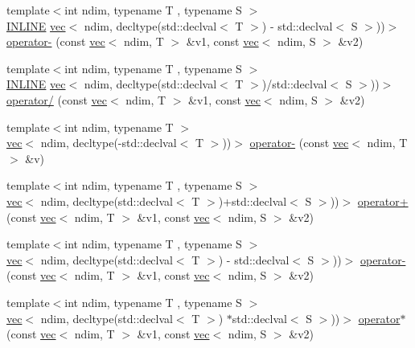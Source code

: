\begin{DoxyCompactItemize}
\item 
{\footnotesize template$<$int ndim, typename T , typename S $>$ }\\\hyperlink{common_8hpp_a2eb6f9e0395b47b8d5e3eeae4fe0c116}{I\+N\+L\+I\+NE} \hyperlink{structshark_1_1ndim_1_1vec}{vec}$<$ ndim, decltype(std\+::declval$<$ T $>$) -\/ std\+::declval$<$ S $>$))$>$ \hyperlink{namespaceshark_1_1ndim_a562ed7a1dc9951ae1674a1988710171c}{operator-\/} (const \hyperlink{structshark_1_1ndim_1_1vec}{vec}$<$ ndim, T $>$ \&v1, const \hyperlink{structshark_1_1ndim_1_1vec}{vec}$<$ ndim, S $>$ \&v2)
\item 
{\footnotesize template$<$int ndim, typename T , typename S $>$ }\\\hyperlink{common_8hpp_a2eb6f9e0395b47b8d5e3eeae4fe0c116}{I\+N\+L\+I\+NE} \hyperlink{structshark_1_1ndim_1_1vec}{vec}$<$ ndim, decltype(std\+::declval$<$ T $>$)/std\+::declval$<$ S $>$))$>$ \hyperlink{namespaceshark_1_1ndim_a6d5687e0b15f386881a84b1918185015}{operator/} (const \hyperlink{structshark_1_1ndim_1_1vec}{vec}$<$ ndim, T $>$ \&v1, const \hyperlink{structshark_1_1ndim_1_1vec}{vec}$<$ ndim, S $>$ \&v2)
\item 
{\footnotesize template$<$int ndim, typename T $>$ }\\\hyperlink{structshark_1_1ndim_1_1vec}{vec}$<$ ndim, decltype(-\/std\+::declval$<$ T $>$))$>$ \hyperlink{namespaceshark_1_1ndim_a7be1c7528e2acd409211d050314c478b}{operator-\/} (const \hyperlink{structshark_1_1ndim_1_1vec}{vec}$<$ ndim, T $>$ \&v)
\item 
{\footnotesize template$<$int ndim, typename T , typename S $>$ }\\\hyperlink{structshark_1_1ndim_1_1vec}{vec}$<$ ndim, decltype(std\+::declval$<$ T $>$)+std\+::declval$<$ S $>$))$>$ \hyperlink{namespaceshark_1_1ndim_a6b4a69e43ee7955d541f6a7a1e9d9ba6}{operator+} (const \hyperlink{structshark_1_1ndim_1_1vec}{vec}$<$ ndim, T $>$ \&v1, const \hyperlink{structshark_1_1ndim_1_1vec}{vec}$<$ ndim, S $>$ \&v2)
\item 
{\footnotesize template$<$int ndim, typename T , typename S $>$ }\\\hyperlink{structshark_1_1ndim_1_1vec}{vec}$<$ ndim, decltype(std\+::declval$<$ T $>$) -\/ std\+::declval$<$ S $>$))$>$ \hyperlink{namespaceshark_1_1ndim_af88fbc3e98ec442203c618c61ce65a87}{operator-\/} (const \hyperlink{structshark_1_1ndim_1_1vec}{vec}$<$ ndim, T $>$ \&v1, const \hyperlink{structshark_1_1ndim_1_1vec}{vec}$<$ ndim, S $>$ \&v2)
\item 
{\footnotesize template$<$int ndim, typename T , typename S $>$ }\\\hyperlink{structshark_1_1ndim_1_1vec}{vec}$<$ ndim, decltype(std\+::declval$<$ T $>$) $\ast$std\+::declval$<$ S $>$))$>$ \hyperlink{namespaceshark_1_1ndim_a22d58cb2f1b5492ff59617c74585903e}{operator$\ast$} (const \hyperlink{structshark_1_1ndim_1_1vec}{vec}$<$ ndim, T $>$ \&v1, const \hyperlink{structshark_1_1ndim_1_1vec}{vec}$<$ ndim, S $>$ \&v2)

\end{DoxyCompactItemize}
